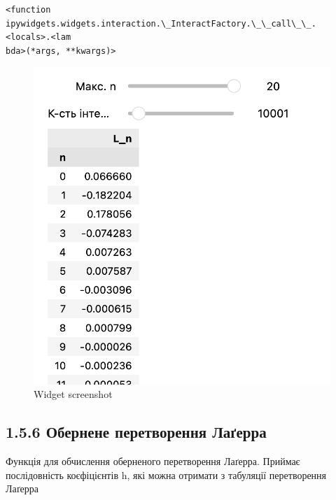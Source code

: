 \documentclass[11pt]{article}
\makeatletter
\newcommand{\boxspacing}{\kern\kvtcb@left@rule\kern\kvtcb@boxsep}
\newcommand{\prompt}[4]{
        {\ttfamily\llap{{\color{#2}[#3]:\hspace{3pt}#4}}\vspace{-\baselineskip}}
    }
\makeatother
\begin{document}
    
            \begin{tcolorbox}[breakable, size=fbox, boxrule=.5pt, pad at break*=1mm, opacityfill=0]
\prompt{Out}{outcolor}{15}{\boxspacing}
\begin{Verbatim}[commandchars=\\\{\}]
<function ipywidgets.widgets.interaction.\_InteractFactory.\_\_call\_\_.<locals>.<lam
bda>(*args, **kwargs)>
\end{Verbatim}
\end{tcolorbox}
        
    \begin{figure}
\centering
\includegraphics{screenshots/classes_4.png}
\caption{Widget screenshot}
\end{figure}

    \subsection*{1.5.6 Обернене перетворення
Лаґерра}\label{ux43eux431ux435ux440ux43dux435ux43dux435-ux43fux435ux440ux435ux442ux432ux43eux440ux435ux43dux43dux44f-ux43bux430ux491ux435ux440ux440ux430}

Функція для обчислення оберненого перетворення Лаґерра. Приймає
послідовність коєфіцієнтів h, які можна отримати з табуляції
перетворення Лаґерра
\end{document}
